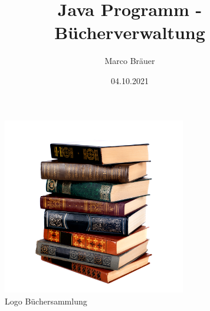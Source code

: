 \title{Java Programm - Bücherverwaltung}
\author{Marco Bräuer}
\date{04.10.2021}
\maketitle
\begin{figure}[h]
\begin{center}
\includegraphics[width=8cm]{img/books.png}
\caption{Logo Büchersammlung}
\label{mein_logo}
\end{center}
\end{figure}

